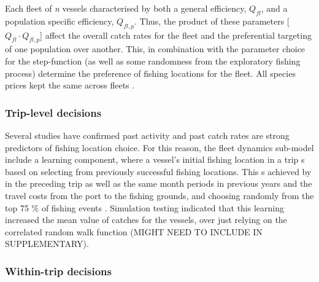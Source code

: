 \documentclass[review]{elsarticle}
\begin{document}
Each fleet of \textit{n} vessels  characterised by
both a general efficiency, $Q_{fl}$, and a population specific efficiency,
${Q_{fl, p}}$.  Thus, the product of these parameters [$Q_{fl} \cdot Q_{fl,
	p}$] affect the overall catch rates for the
fleet and the preferential targeting of one population over another. This, in
combination with the parameter choice for the step-function
 (as well as some randomness from the exploratory
fishing process) determine the preference of fishing
locations for the fleet.  All species prices  kept
the same across fleets .  

\subsubsection{Trip-level decisions}

Several studies \citep[e.g.][]{Hutton2004, Tidd2012, Girardin2015} have
confirmed past activity and past catch rates are strong predictors of fishing
location choice. For this reason, the fleet dynamics sub-model
include a learning component, where a vessel's initial
fishing location in a trip s based on selecting from
previously successful fishing locations. This s achieved
by  in the preceding trip as well as the same month
periods in previous years and the travel costs from the port to the fishing
grounds, and choosing randomly from the top 75 \% of fishing events
. Simulation
testing indicated that this learning increased the mean value of catches for
the vessels, over just relying on the correlated random walk
 function  (MIGHT NEED TO INCLUDE
IN SUPPLEMENTARY). 

\subsubsection{Within-trip decisions}
\end{document}
